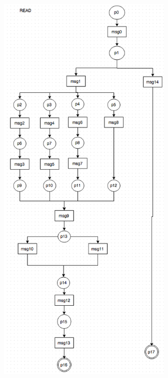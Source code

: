 \documentclass[conference]{IEEEtran}
\begin{document}
 \begin{figure} 
 \centerline{
 \includegraphics[width=3.33in]{figures/Fih6.png}}
 

\end{figure}
\end{document}
